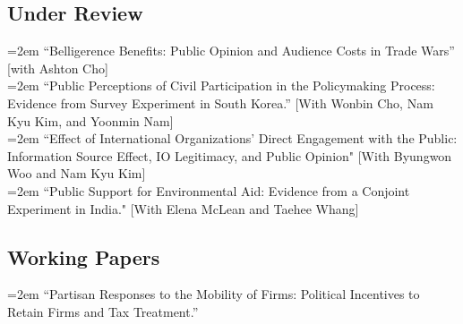 

\subsection*{Under Review}


\hangindent=2em
``Belligerence Benefits: Public Opinion and Audience Costs in Trade Wars'' [with Ashton Cho] \\

\hangindent=2em
``Public Perceptions of Civil Participation in the Policymaking Process: Evidence from Survey Experiment in South Korea.'' [With Wonbin Cho, Nam Kyu Kim, and Yoonmin Nam] \\

\hangindent=2em
``Effect of International Organizations’ Direct Engagement with the Public: Information Source Effect, IO Legitimacy, and Public Opinion" [With Byungwon Woo and Nam Kyu Kim]  \\




\hangindent=2em ``Public Support for Environmental Aid: Evidence from a Conjoint Experiment in India." [With Elena McLean and Taehee Whang] \\






\subsection*{Working Papers}

\hangindent=2em
``Partisan Responses to the Mobility of Firms: Political Incentives to Retain Firms and Tax Treatment.'' \\

